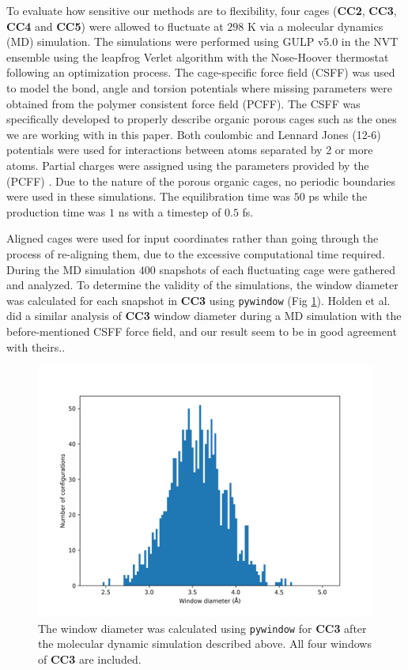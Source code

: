 \documentclass[journal=jacsat,manuscript=article]{achemso}
\begin{document}
{\color{red}To evaluate how sensitive our methods are to flexibility, four cages (\textbf{CC2}, \textbf{CC3}, \textbf{CC4} and \textbf{CC5}) were allowed to fluctuate at $298$ K via a molecular dynamics (MD) simulation. The simulations were performed using GULP v5.0 \cite{julian2003gulp} in the NVT ensemble using the leapfrog Verlet algorithm with the Nose-Hoover thermostat following an optimization process. The cage-specific force field (CSFF) was used to model the bond, angle and torsion potentials \cite{holden2012bespoke} where missing parameters were obtained from the polymer consistent force field (PCFF). The CSFF was specifically developed to properly describe organic porous cages such as the ones we are working with in this paper. Both coulombic and Lennard Jones (12-6) potentials were used for interactions between atoms separated by 2 or more atoms. Partial charges were assigned using the parameters provided by the (PCFF) \cite{sun1998compass}\cite{holden2012bespoke} . Due to the nature of the porous organic cages, no periodic boundaries were used in these simulations. The equilibration time was $50$ ps while the production time was $1$ ns with a timestep of $0.5$ fs.

Aligned cages were used for input coordinates rather than going through the process of re-aligning them, due to the excessive computational time required. During the MD simulation $400$ snapshots of each fluctuating cage were gathered and analyzed. To determine the validity of the simulations, the window diameter was calculated for each snapshot in \textbf{CC3} using \texttt{pywindow} (Fig \ref{fig:window_diameter_hist}). Holden et al. did a similar analysis of \textbf{CC3} window diameter during a MD simulation with the before-mentioned CSFF force field, and our result seem to be in good agreement with theirs.\cite{holden2012bespoke}.

\begin{figure}
\centering
	\includegraphics[width=0.65\columnwidth]{../cc3_histogram.png}
	\caption{\color{red}The window diameter was calculated using \texttt{pywindow} for \textbf{CC3} after the molecular dynamic simulation described above. All four windows of \textbf{CC3} are included.
	} \label{fig:window_diameter_hist}
\end{figure}

}
\end{document}
